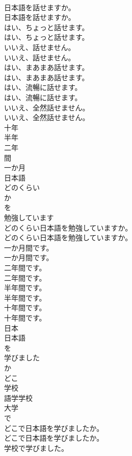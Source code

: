 \documentclass[8pt]{extreport}
\begin{document}
\begin{CJK}{UTF8}{min}
\\	日本語を話せますか。	
\\	日本語を話せますか。 
\\	はい、ちょっと話せます。	
\\	はい、ちょっと話せます。 
\\	いいえ、話せません。	
\\	いいえ、話せません。 
\\	はい、まあまあ話せます。	
\\	はい、まあまあ話せます。 
\\	はい、流暢に話せます。	
\\	はい、流暢に話せます。 
\\	いいえ、全然話せません。	
\\	いいえ、全然話せません。 
\\	十年
\\	半年
\\	二年
\\	間
\\	一か月
\\	日本語
\\	どのくらい
\\	か
\\	を
\\	勉強しています
\\	どのくらい日本語を勉強していますか。	
\\	どのくらい日本語を勉強していますか。 
\\	一か月間です。	
\\	一か月間です。 
\\	二年間です。	
\\	二年間です。 
\\	半年間です。	
\\	半年間です。 
\\	十年間です。	
\\	十年間です。 
\\	日本
\\	日本語
\\	を
\\	学びました
\\	か
\\	どこ
\\	学校
\\	語学学校
\\	大学
\\	で
\\	どこで日本語を学びましたか。	
\\	どこで日本語を学びましたか。 
\\	学校で学びました。	

\end{CJK}
\end{document}
